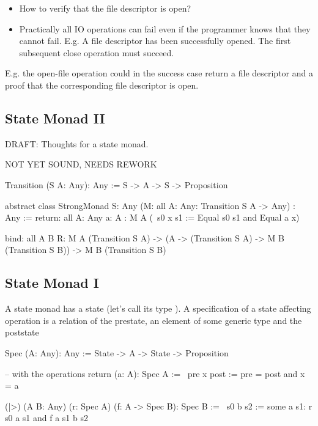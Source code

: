 \begin{itemize}
\item How to verify that the file descriptor is open?


\item Practically all IO operations can fail even if the programmer knows that
  they cannot fail. E.g. A file descriptor has been successfully opened. The
  first subsequent close operation must succeed.

\end{itemize}


E.g. the open-file operation could in the success case return a file
descriptor and a proof that the corresponding file descriptor is open.







\subsection{State Monad II}


\noindent DRAFT: Thoughts for a state monad.

NOT YET SOUND, NEEDS REWORK


\begin{alba}
    Transition (S A: Any): Any :=
        S -> A -> S -> Proposition


    abstract class
        StrongMonad
            {S: Any}
            (M: all {A: Any}: Transition S A -> Any)
            : Any
    :=
        return:
            all
                {A: Any}
                {a: A}
                : M A (\ s0 x s1 := Equal s0 s1 and Equal a x)

        bind:
            all {A B R}:
                M A (Transition S A)
                -> (A -> (Transition S A) -> M B (Transition S B))
                -> M B (Transition S B)
\end{alba}







\subsection {State Monad I}

A state monad has a state (let's call its type ). A specification of
a state affecting operation is a relation of the prestate, an element of some
generic type and the poststate
%
\begin{alba}
    Spec (A: Any): Any :=
        State -> A -> State -> Proposition

    -- with the operations
    return (a: A): Spec A :=
        \ pre x post :=
            pre = post and x = a

    (|>) (A B: Any) (r: Spec A) (f: A -> Spec B): Spec B :=
        \ s0 b s2 :=
            some a s1:
                r s0 a s1
                and f a s1 b s2
\end{alba}

